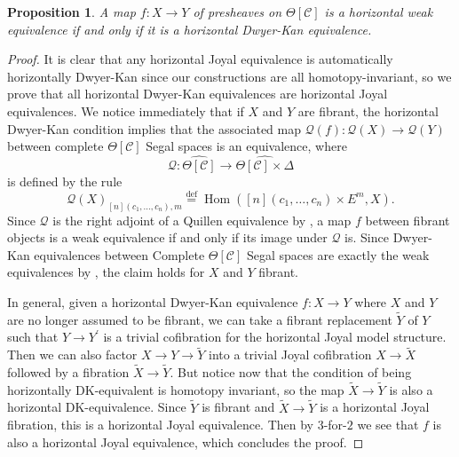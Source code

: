 \documentclass[a4paper]{article}
\numberwithin{equation}{subsection}
\theoremstyle{plain}   %
\newtheorem{prop}[equation]{Proposition}
\theoremstyle{definition}
\theoremstyle{remark}
\theoremstyle{plain}
\DeclareMathOperator{\Hom}{Hom}
\newcommand{\psh}[1]{\ensuremath{\widehat{#1}}}
\providecommand{\C}{}
\renewcommand{\C}{\ensuremath{\mathcal{C}}}
\newcommand{\defeq}{\overset{\mathrm{def}}=}
\newcommand{\cellset}{\ensuremath{\widehat{\Theta[\mathcal{C}]}}}
\begin{document}
\begin{prop} A map \(f:X\to Y\) of presheaves on \(\Theta[\C]\) is a horizontal weak equivalence if and only if it is a horizontal Dwyer-Kan equivalence.
\end{prop}
\begin{proof}
	It is clear that any horizontal Joyal equivalence is automatically horizontally Dwyer-Kan since our constructions are all homotopy-invariant, so we prove that all horizontal Dwyer-Kan equivalences are horizontal Joyal equivalences.  We notice immediately that if \(X\) and \(Y\) are fibrant, the horizontal Dwyer-Kan condition implies that the associated map \(\mathcal{Q}(f):\mathcal{Q}(X)\to \mathcal{Q}(Y)\) between complete \(\Theta[\C]\) Segal spaces is an equivalence, where
	\[\mathcal{Q}:\cellset \to \psh{\Theta[\C]\times \Delta}\]
	is defined by the rule
	\[\mathcal{Q}(X)_{[n](c_1,\dots,c_n),m} \defeq\Hom([n](c_1,\dots,c_n)\times E^m,X).\]
	Since \(\mathcal{Q}\) is the right adjoint of a Quillen equivalence by , a map \(f\) between fibrant objects is a weak equivalence if and only if its image under \(\mathcal{Q}\) is. Since Dwyer-Kan equivalences between Complete \(\Theta[\C]\) Segal spaces are exactly the weak equivalences by \cite{rezk-theta-n-spaces}, the claim holds for \(X\) and \(Y\) fibrant.

	In general, given a horizontal Dwyer-Kan equivalence \(f:X\to Y\) where \(X\) and \(Y\) are no longer assumed to be fibrant, we can take a fibrant replacement \(\tilde{Y}\) of \(Y\) such that \(Y\to Y^\prime\) is a trivial cofibration for the horizontal Joyal model structure.  Then we can also factor \(X\to Y\to \tilde{Y}\) into a trivial Joyal cofibration \(X\to \tilde{X}\) followed by a fibration \(\tilde{X}\to \tilde{Y}\).  But notice now that the condition of being horizontally DK-equivalent is homotopy invariant, so the map \(\tilde{X}\to \tilde{Y}\) is also a horizontal DK-equivalence.  Since \(\tilde{Y}\) is fibrant and \(\tilde{X}\to \tilde{Y}\) is a horizontal Joyal fibration, this is a horizontal Joyal equivalence.  Then by \(3\)-for-\(2\)  we see that \(f\) is also a horizontal Joyal equivalence, which concludes the proof.
\end{proof}
\end{document}
